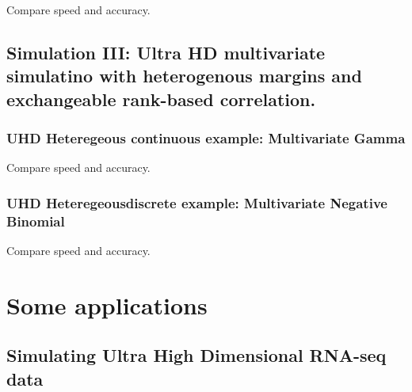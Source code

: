 \documentclass[
]{article}
\begin{document}
Compare speed and accuracy.

\hypertarget{simulation-iii-ultra-hd-multivariate-simulatino-with-heterogenous-margins-and-exchangeable-rank-based-correlation.}{%
\subsection{Simulation III: Ultra HD multivariate simulatino with heterogenous margins and exchangeable rank-based correlation.}\label{simulation-iii-ultra-hd-multivariate-simulatino-with-heterogenous-margins-and-exchangeable-rank-based-correlation.}}

\hypertarget{uhd-heteregeous-continuous-example-multivariate-gamma}{%
\subsubsection{UHD Heteregeous continuous example: Multivariate Gamma}\label{uhd-heteregeous-continuous-example-multivariate-gamma}}

Compare speed and accuracy.

\hypertarget{uhd-heteregeousdiscrete-example-multivariate-negative-binomial}{%
\subsubsection{UHD Heteregeousdiscrete example: Multivariate Negative Binomial}\label{uhd-heteregeousdiscrete-example-multivariate-negative-binomial}}

Compare speed and accuracy.

\hypertarget{some-applications}{%
\section{Some applications}\label{some-applications}}

\hypertarget{simulating-ultra-high-dimensional-rna-seq-data}{%
\subsection{Simulating Ultra High Dimensional RNA-seq data}\label{simulating-ultra-high-dimensional-rna-seq-data}}
\end{document}
